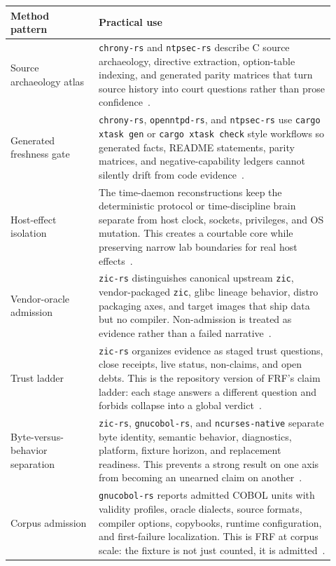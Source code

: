 \documentclass[11pt,a4paper]{article}
\newcommand{\frf}{\textsc{FRF}}
\begin{document}
\begin{longtable}{>{\raggedright\arraybackslash}p{0.25\linewidth}>{\raggedright\arraybackslash}p{0.67\linewidth}}
\toprule
\textbf{Method pattern} & \textbf{Practical use} \\
\midrule
\endhead
Source archaeology atlas & \texttt{chrony-rs} and \texttt{ntpsec-rs} describe C source archaeology, directive extraction, option-table indexing, and generated parity matrices that turn source history into court questions rather than prose confidence~\cite{chronyrs,ntpsecrs}. \\
Generated freshness gate & \texttt{chrony-rs}, \texttt{openntpd-rs}, and \texttt{ntpsec-rs} use \texttt{cargo xtask gen} or \texttt{cargo xtask check} style workflows so generated facts, README statements, parity matrices, and negative-capability ledgers cannot silently drift from code evidence~\cite{chronyrs,openntpdrs,ntpsecrs}. \\
Host-effect isolation & The time-daemon reconstructions keep the deterministic protocol or time-discipline brain separate from host clock, sockets, privileges, and OS mutation. This creates a courtable core while preserving narrow lab boundaries for real host effects~\cite{chronyrs,openntpdrs,ntpsecrs}. \\
Vendor-oracle admission & \texttt{zic-rs} distinguishes canonical upstream \texttt{zic}, vendor-packaged \texttt{zic}, glibc lineage behavior, distro packaging axes, and target images that ship data but no compiler. Non-admission is treated as evidence rather than a failed narrative~\cite{zicrs}. \\
Trust ladder & \texttt{zic-rs} organizes evidence as staged trust questions, close receipts, live status, non-claims, and open debts. This is the repository version of \frf{}'s claim ladder: each stage answers a different question and forbids collapse into a global verdict~\cite{zicrs}. \\
Byte-versus-behavior separation & \texttt{zic-rs}, \texttt{gnucobol-rs}, and \texttt{ncurses-native} separate byte identity, semantic behavior, diagnostics, platform, fixture horizon, and replacement readiness. This prevents a strong result on one axis from becoming an unearned claim on another~\cite{zicrs,gnucobolrs,ncursesnative}. \\
Corpus admission & \texttt{gnucobol-rs} reports admitted COBOL units with validity profiles, oracle dialects, source formats, compiler options, copybooks, runtime configuration, and first-failure localization. This is \frf{} at corpus scale: the fixture is not just counted, it is admitted~\cite{gnucobolrs}. \\

\end{longtable}
\end{document}
